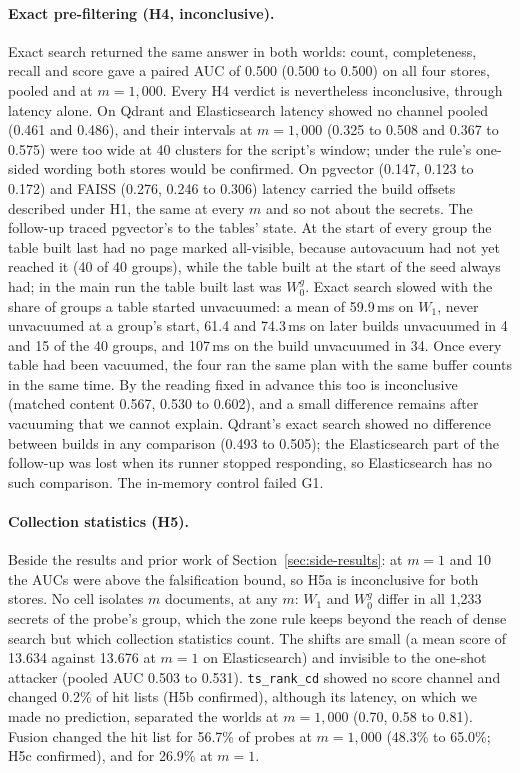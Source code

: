 \paragraph{Exact pre-filtering (H4, inconclusive).}
Exact search returned the same answer in both worlds: count, completeness, recall and score gave a
paired AUC of 0.500 (0.500 to 0.500) on all four stores, pooled and at $m = 1{,}000$. Every H4 verdict
is nevertheless inconclusive, through latency alone. On Qdrant and Elasticsearch latency showed no
channel pooled (0.461 and 0.486), and their intervals at $m = 1{,}000$ (0.325 to 0.508 and 0.367 to
0.575) were too wide at 40 clusters for the script's window; under the rule's one-sided wording both
stores would be confirmed. On pgvector (0.147, 0.123 to 0.172) and FAISS (0.276, 0.246 to 0.306)
latency carried the build offsets described under H1, the same at every $m$ and so not about the
secrets. The follow-up traced pgvector's to the tables' state. At the start of every group the table
built last had no page marked all-visible, because autovacuum had not yet reached it (40 of 40
groups), while the table built at the start of the seed always had; in the main run the table built
last was $W_0^g$. Exact search slowed with the share of groups a table started unvacuumed: a mean of
59.9\,ms on $W_1$, never unvacuumed at a group's start, 61.4 and 74.3\,ms on later builds unvacuumed in
4 and 15 of the 40 groups, and 107\,ms on the build unvacuumed in 34. Once every table had been vacuumed, the four
ran the same plan with the same buffer counts in the same time. By the reading fixed in advance this
too is inconclusive (matched content 0.567, 0.530 to 0.602), and a small difference remains after
vacuuming that we cannot explain. Qdrant's exact search showed no difference between builds in any
comparison (0.493 to 0.505); the Elasticsearch part of the follow-up was lost when its runner stopped
responding, so Elasticsearch has no such comparison. The in-memory control failed G1.

\paragraph{Collection statistics (H5).}
Beside the results and prior work of Section~\ref{sec:side-results}: at $m = 1$ and 10 the AUCs were above the
falsification bound, so H5a is inconclusive for both stores. No cell isolates $m$
documents, at any $m$: $W_1$ and $W_0^g$ differ in all 1,233 secrets of the probe's group, which the zone rule keeps
beyond the reach of dense search but which collection statistics count. The shifts are small (a mean
score of 13.634 against 13.676 at $m = 1$ on Elasticsearch) and invisible to the one-shot attacker
(pooled AUC 0.503 to 0.531). \texttt{ts\_rank\_cd} showed no score channel and changed 0.2\% of hit
lists (H5b confirmed), although its latency, on which we made no prediction, separated the worlds at $m = 1{,}000$ (0.70, 0.58 to 0.81). Fusion changed the hit list for 56.7\% of probes at $m = 1{,}000$ (48.3\%
to 65.0\%; H5c confirmed), and for 26.9\% at $m = 1$.

